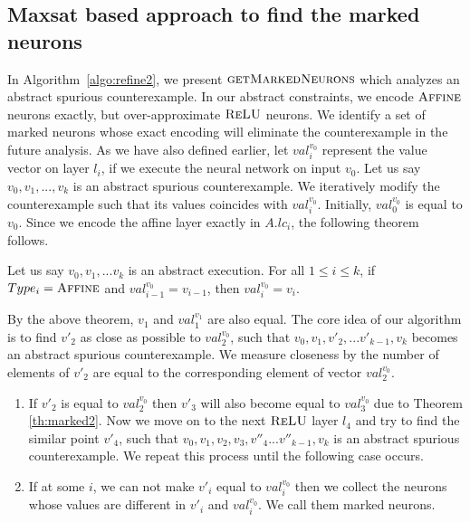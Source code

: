 
\subsection{Maxsat based approach to find the marked neurons}
\label{sec:markedneurons}
In Algorithm~\ref{algo:refine2}, we present $\textsc{getMarkedNeurons}$
which analyzes an abstract spurious counterexample.
In our abstract constraints, we encode $\textsc{Affine}${} neurons exactly, but
over-approximate $\textsc{ReLU}${} neurons.
We identify a set of
marked neurons whose exact encoding will eliminate the counterexample
in the future analysis.
%
%
As we have also defined earlier, let ${val_i^{{v_0}}}$ represent the value vector
on layer $l_i$, if we execute the neural network on input ${v_0}$.
%
Let us say ${v_0}, {v_1}, ... ,{v_k}$ is an abstract spurious counterexample.
We iteratively modify the counterexample such that its values coincides with ${val_i^{{v_0}}}$.
Initially, ${val_0^{{v_0}}}$ is equal to $v_0$.
Since we encode the affine layer exactly in $A.lc_i$, the following
theorem follows.


\begin{theorem}
  \label{th:marked2}
  Let us say ${v_0}, {v_1}, ... {v_k}$ is an abstract execution. For all $1\leq i\leq k$, if $Type_i = \textsc{Affine}$ and ${val_{i-1}^{{v_0}}} = {v_{i-1}}$, then ${val_i^{{v_0}}} = {v_i}$.
\end{theorem}

By the above theorem, ${v_1}$ and ${val_1^{v_1}}$ are also equal. 
The core idea of our algorithm is to find ${v'_2}$ as close as possible to ${val_2^{v_0}}$, 
such that ${v_0}, {v_1}, {v'_2}, ... {v'_{k-1}}, {v_k}$ becomes an abstract spurious counterexample. 
We measure closeness by the number of elements of ${v'_2}$ are equal to the 
corresponding element of vector ${val_2^{v_0}}$.
\begin{enumerate}
\item If ${v'_2}$ is equal to ${val_2^{v_0}}$ then ${v'_3}$ will also become 
  equal to ${val_3^{v_0}}$ due to Theorem \ref{th:marked2}. 
  Now we move on to the next $\textsc{ReLU}${} layer $l_4$ and try to find the similar point ${v'_4}$, such that 
  ${v_0}, {v_1}, {v_2}, {v_3},{v''_4}... {v''_{k-1}},{v_k}$ is an abstract spurious counterexample. 
  We repeat this process until the following case occurs. 
\item If at some $i$, we can not make ${v'_i}$ equal to ${val_i^{v_0}}$ then we collect the neurons
  whose values are different in ${v'_i}$ and ${val_i^{v_0}}$. We call them marked neurons.
\end{enumerate}


